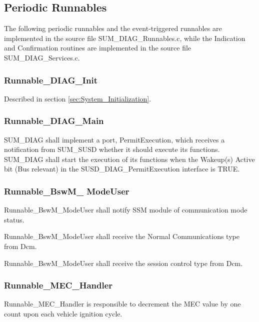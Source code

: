 \subsection{Periodic Runnables}
\label{subsec:Periodic_Run}
The following periodic runnables and the event-triggered runnables are implemented in the source file SUM_DIAG_Runnables.c, while the Indication and Confirmation routines are implemented in the source file SUM_DIAG_Services.c.

\subsubsection{Runnable_DIAG_Init}
{
Described in section \ref{sec:System_Initialization}.
}
\subsubsection{Runnable_DIAG_Main}
\label{subsec:Runnable_DIAG_Main}
{
SUM_DIAG shall implement a port, PermitExecution, which receives a notification from SUM_SUSD whether it should execute its functions. 
}
{}
SUM_DIAG shall start the execution of its functions when the Wakeup(s) Active bit (Bus relevant) in the SUSD_DIAG_PermitExecution interface is TRUE.\newline
{}



\subsubsection{Runnable_BswM_ ModeUser}

{
Runnable_BswM_ModeUser shall notify SSM module of communication mode status.
}
{}

{
Runnable_BswM_ModeUser shall receive the Normal Communications type from Dcm.
}
{}

{
Runnable_BswM_ModeUser shall receive the session control type from Dcm.
}
{}



\subsubsection{Runnable_MEC_Handler}

{
Runnable_MEC_Handler is responsible to decrement the MEC value by one count upon each vehicle ignition cycle.
}
{}

